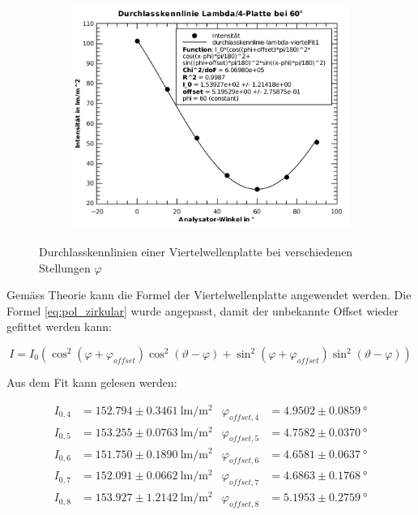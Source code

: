 \begin{figure}[H]
    \centering
    \begin{subfigure}{.45\linewidth}
        \includegraphics[width=\linewidth]{images/aufgabe-5_60grad.pdf}
    \end{subfigure}
    \caption{Durchlasskennlinien einer Viertelwellenplatte bei verschiedenen Stellungen $\varphi$}
\end{figure}

Gem\"ass Theorie kann die Formel der Viertelwellenplatte angewendet werden.  Die
Formel \ref{eq:pol_zirkular} wurde angepasst, damit der unbekannte Offset wieder
gefittet werden kann:

\begin{equation}
    I = I_0\left(\cos^2(\varphi+\varphi_{offset})\cos^2(\vartheta-\varphi) + \sin^2(\varphi+\varphi_{offset})\sin^2(\vartheta-\varphi)\right)
\end{equation}

Aus dem Fit kann gelesen werden:

\begin{align*}
    I_{0,4} &= 152.794 \pm 0.3461\SI{}{\lumen\per\square\meter} & \varphi_{offset,4} &= 4.9502 \pm 0.0859\SI{}{\degree} \\
    I_{0,5} &= 153.255 \pm 0.0763\SI{}{\lumen\per\square\meter} & \varphi_{offset,5} &= 4.7582 \pm 0.0370\SI{}{\degree} \\
    I_{0,6} &= 151.750 \pm 0.1890\SI{}{\lumen\per\square\meter} & \varphi_{offset,6} &= 4.6581 \pm 0.0637\SI{}{\degree} \\
    I_{0,7} &= 152.091 \pm 0.0662\SI{}{\lumen\per\square\meter} & \varphi_{offset,7} &= 4.6863 \pm 0.1768\SI{}{\degree} \\
    I_{0,8} &= 153.927 \pm 1.2142\SI{}{\lumen\per\square\meter} & \varphi_{offset,8} &= 5.1953 \pm 0.2759\SI{}{\degree} \\
\end{align*}


